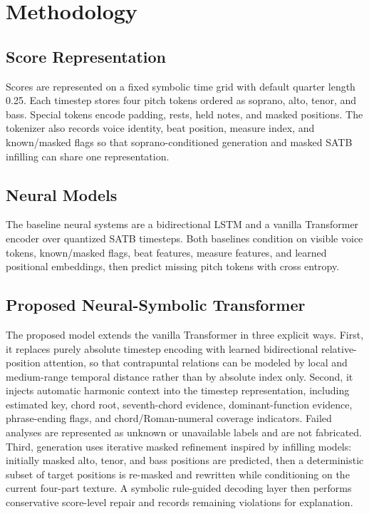\section{Methodology}

\subsection{Score Representation}

Scores are represented on a fixed symbolic time grid with default quarter length 0.25. Each timestep stores four pitch tokens ordered as soprano, alto, tenor, and bass. Special tokens encode padding, rests, held notes, and masked positions. The tokenizer also records voice identity, beat position, measure index, and known/masked flags so that soprano-conditioned generation and masked SATB infilling can share one representation.

\subsection{Neural Models}

The baseline neural systems are a bidirectional LSTM and a vanilla Transformer encoder over quantized SATB timesteps. Both baselines condition on visible voice tokens, known/masked flags, beat features, measure features, and learned positional embeddings, then predict missing pitch tokens with cross entropy.

\subsection{Proposed Neural-Symbolic Transformer}

The proposed model extends the vanilla Transformer in three explicit ways. First, it replaces purely absolute timestep encoding with learned bidirectional relative-position attention, so that contrapuntal relations can be modeled by local and medium-range temporal distance rather than by absolute index only. Second, it injects automatic harmonic context into the timestep representation, including estimated key, chord root, seventh-chord evidence, dominant-function evidence, phrase-ending flags, and chord/Roman-numeral coverage indicators. Failed analyses are represented as unknown or unavailable labels and are not fabricated. Third, generation uses iterative masked refinement inspired by infilling models: initially masked alto, tenor, and bass positions are predicted, then a deterministic subset of target positions is re-masked and rewritten while conditioning on the current four-part texture. A symbolic rule-guided decoding layer then performs conservative score-level repair and records remaining violations for explanation.

